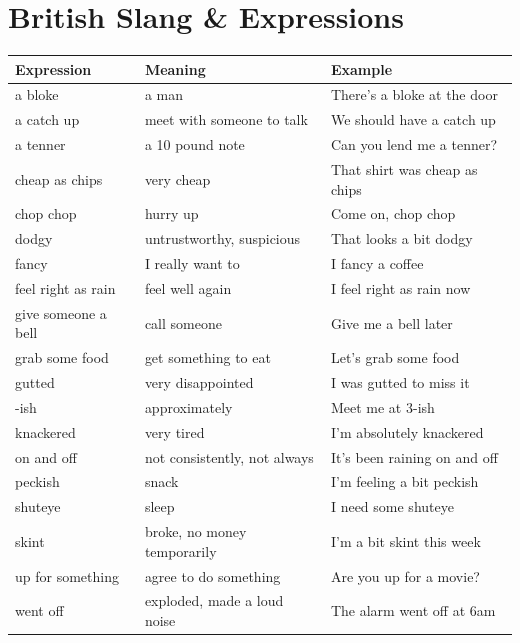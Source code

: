 \section{British Slang \& Expressions}
\begin{longtable}{p{}p{}p{}}
\textbf{Expression} & \textbf{Meaning} & \textbf{Example} \\
\hline
\endhead
a bloke & a man & There's a bloke at the door \\
a catch up & meet with someone to talk & We should have a catch up \\
a tenner & a 10 pound note & Can you lend me a tenner? \\
cheap as chips & very cheap & That shirt was cheap as chips \\
chop chop & hurry up & Come on, chop chop \\
dodgy & untrustworthy, suspicious & That looks a bit dodgy \\
fancy & I really want to & I fancy a coffee \\
feel right as rain & feel well again & I feel right as rain now \\
give someone a bell & call someone & Give me a bell later \\
grab some food & get something to eat & Let's grab some food \\
gutted & very disappointed & I was gutted to miss it \\
-ish & approximately & Meet me at 3-ish \\
knackered & very tired & I'm absolutely knackered \\
on and off & not consistently, not always & It's been raining on and off \\
peckish & snack & I'm feeling a bit peckish \\
shuteye & sleep & I need some shuteye \\
skint & broke, no money temporarily & I'm a bit skint this week \\
up for something & agree to do something & Are you up for a movie? \\
went off & exploded, made a loud noise & The alarm went off at 6am \\

\end{longtable}

